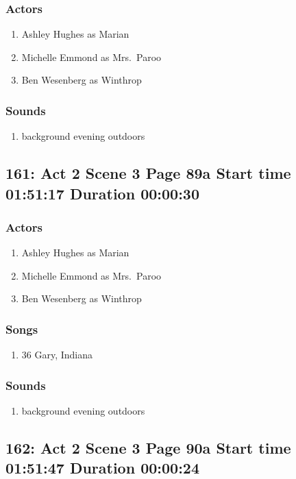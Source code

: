 \subsubsection{Actors}
\begin{enumerate}
\item Ashley Hughes as Marian
\item Michelle Emmond as Mrs.~Paroo
\item Ben Wesenberg as Winthrop
\end{enumerate}

\subsubsection{Sounds}
\begin{enumerate}
\item background evening outdoors
\end{enumerate}
\subsection{161: Act 2 Scene 3 Page 89a Start time 01:51:17 Duration 00:00:30}

\subsubsection{Actors}
\begin{enumerate}
\item Ashley Hughes as Marian
\item Michelle Emmond as Mrs.~Paroo
\item Ben Wesenberg as Winthrop
\end{enumerate}

\subsubsection{Songs}
\begin{enumerate}
\item 36 Gary, Indiana
\end{enumerate}\subsubsection{Sounds}
\begin{enumerate}
\item background evening outdoors
\end{enumerate}
\subsection{162: Act 2 Scene 3 Page 90a Start time 01:51:47 Duration 00:00:24}


